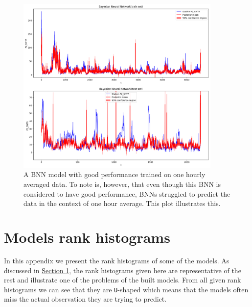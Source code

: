 \documentclass[12pt,a4paper,twoside]{scrartcl}
\numberwithin{equation}{section}
\newcommand{\refsec}[1]{\hyperref[#1]{Section \ref*{#1}}}
\newcounter{mypagecount}%
\newenvironment{interlude}{%
  \clearpage
  \setcounter{mypagecount}{\value{page}}%
  \thispagestyle{empty}%
  \pagestyle{empty}%
}{%
  \clearpage
  \setcounter{page}{\value{mypagecount}}%
}
\let\chapter=\section %
\begin{document}
\begin{interlude}
\begin{appendices}
\begin{center}
\begin{figure}[htpb]
        \includegraphics[height=0.6\textwidth, width=0.9\textwidth]{figures/model_plots/bnn_1h}
        \caption[BNN one hour plot]{A BNN model with good performance trained on one hourly averaged data. To note is, however, that even though this BNN is considered to have good performance, BNNs struggled to predict the data in the context of one hour average. This plot illustrates this.}\label{fig:bnn-plot-1h}
      \end{figure}
    \end{center}
    \clearpage
    
    \chapter{Models rank histograms}
    In this appendix we present the rank histograms of some of the models. As discussed in \refsec{}, the rank histograms given here are representative of the rest and illustrate one of the problems of the built models. From all given rank histograms we can see that they are \texttt{U}-shaped which means that the models often miss the actual observation they are trying to predict.
    

\end{appendices}
\end{interlude}
\end{document}
